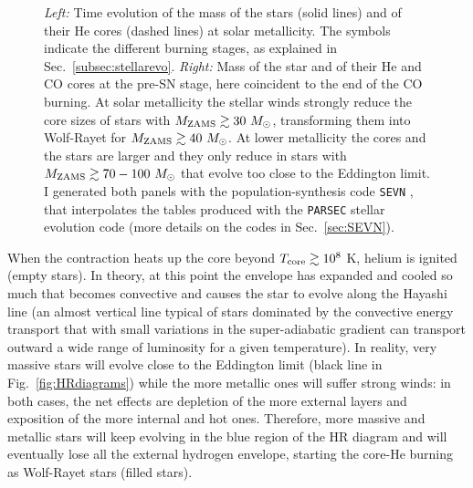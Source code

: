 \documentclass[a4paper,titlepage]{book}     	%
\newcommand{\sun}{\ensuremath{_\odot}}
\newcommand{\mzams}{M_\textup{ZAMS}}
\newcommand{\msun}{\ensuremath{M\sun}}
\begin{document}
\begin{figure}[h!]
\begin{minipage}{.49\textwidth}
	\end{minipage}
	\caption{\emph{Left:} Time evolution of the mass of the stars (solid lines) and of their He cores (dashed lines) at solar metallicity. The symbols indicate the different burning stages, as explained in Sec.\ \ref{subsec:stellarevo}. \emph{Right:} Mass of the star and of their He and CO cores at the pre-SN stage, here coincident to the end of the CO burning. At solar metallicity the stellar winds strongly reduce the core sizes of stars with $\mzams \gtrsim 30 ~\msun$, transforming them into Wolf-Rayet for $\mzams \gtrsim 40 ~\msun$. At lower metallicity the cores and the stars are larger and they only reduce in stars with $\mzams \gtrsim 70-100 ~\msun$ that evolve too close to the Eddington limit. I generated both panels with the population-synthesis code \texttt{SEVN} \cite{spera2019_mergingBBH}, that interpolates the tables produced with the \texttt{PARSEC} stellar evolution code \cite{parsec2015_chen} (more details on the codes in Sec.\ \ref{sec:SEVN}).}\label{fig:masslostWR}
\end{figure}



When the contraction heats up the core beyond $T_{\rm core} \gtrsim 10^{8}$ K, helium is ignited (empty stars). In theory, at this point the envelope has expanded and cooled so much that becomes convective and causes the star to evolve along the Hayashi line (an almost vertical line typical of stars dominated by the convective energy transport that with small variations in the super-adiabatic gradient can transport outward a wide range of luminosity for a given temperature). In reality, very massive stars will evolve close to the Eddington limit (black line in Fig.\ \ref{fig:HRdiagrams}) while the more metallic ones will suffer strong winds: in both cases, the net effects are depletion of the more external layers and exposition of the more internal and hot ones. Therefore, more massive and metallic stars will keep evolving in the blue region of the HR diagram and will eventually lose all the external hydrogen envelope, starting the core-He burning as Wolf-Rayet stars (filled stars). 
\end{document}
